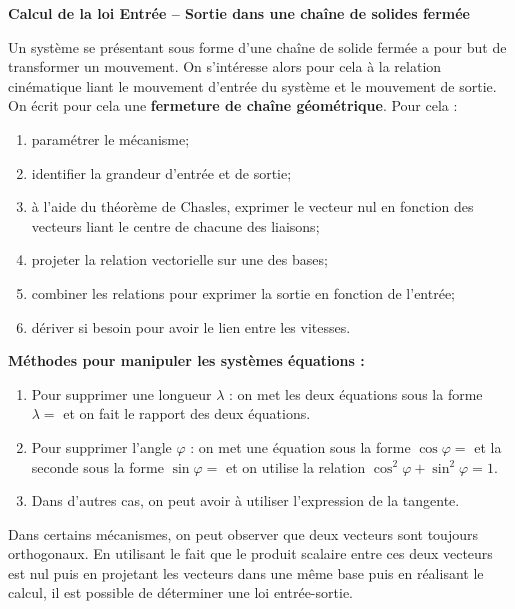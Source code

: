 \begin{methode}
\textbf{Calcul de la loi Entrée -- Sortie dans une chaîne de solides fermée}

Un système se présentant sous forme d'une chaîne de solide fermée a pour but de transformer un mouvement. On s'intéresse alors pour cela à la relation cinématique liant le mouvement d'entrée du système et le mouvement de sortie. On écrit pour cela une \textbf{fermeture de chaîne géométrique}. Pour cela :
\begin{enumerate}
\item paramétrer le mécanisme;
\item identifier la grandeur d'entrée et de sortie;
\item à l'aide du théorème de Chasles, exprimer le vecteur nul en fonction des vecteurs liant le centre de chacune des liaisons;
\item projeter la relation vectorielle sur une des bases;
\item combiner les relations pour exprimer la sortie en fonction de l'entrée;
\item dériver si besoin pour avoir le lien entre les vitesses. 
\end{enumerate}
\end{methode}


\begin{methode}
\textbf{Méthodes pour manipuler les systèmes équations :} 
\begin{enumerate}
\item Pour supprimer une longueur $\lambda$ : on met les deux équations sous la forme $\lambda =$ et on fait le rapport des deux équations.
\item Pour supprimer l'angle $\varphi$ : on met une équation sous la forme $\cos\varphi = $ et la seconde sous la forme $\sin\varphi = $ et on utilise la relation $\cos^2\varphi +\sin^2\varphi =1 $.
\item Dans d'autres cas, on peut avoir à utiliser l'expression de la tangente.
\end{enumerate}
\end{methode}


\begin{methode}
Dans certains mécanismes, on peut observer que deux vecteurs sont toujours orthogonaux. En utilisant le fait que le produit scalaire entre ces deux vecteurs est nul puis en projetant les vecteurs dans une même base puis en réalisant le calcul, il est possible de déterminer une loi entrée-sortie.
\end{methode}
%


